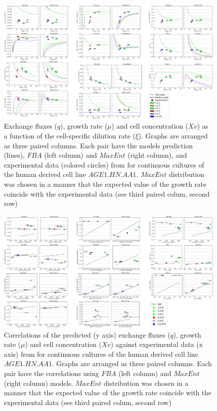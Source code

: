 \documentclass[]{article}
\begin{document}
	\begin{figure}
		\centering
		\includegraphics[scale = 0.6]{plots_q_Human}
		\caption{Exchange fluxes ($q$), growth rate ($\mu$) and cell concentration ($Xv$) as a function of the cell-specific dilution rate ($\xi$). Graphs are arranged as three paired columns. Each pair have the models prediction (lines),  $FBA$ (left column) and $MaxEnt$ (right column), and experimental data (colored circles) from \protect{} for continuous cultures of the human derived cell line $AGE1.HN.AA1$. $MaxEnt$ distribution was chosen in a manner that the expected value of the growth rate coincide with the experimental data (see third paired colum, second row)} 
	\end{figure}

	\begin{figure}
		\centering
		\includegraphics[scale = 0.6]{corr_q_Human}
		\caption{Correlations of the predicted (y axis) exchange fluxes ($q$), growth rate ($\mu$) and cell concentration ($Xv$) against experimental data (x axis) from \protect{} for continuous cultures of the human derived cell line $AGE1.HN.AA1$. Graphs are arranged as three paired columns. Each pair have the correlations using $FBA$ (left column) and $MaxEnt$ (right column) models. $MaxEnt$ distribution was chosen in a manner that the expected value of the growth rate coincide with the experimental data (see third paired colum, second row)}
	\end{figure}
\end{document}
